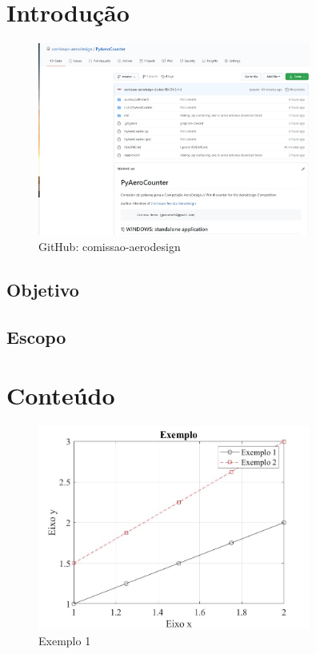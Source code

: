 \chapter{Introdução}
\label{cap:introducao}

\lipsum[1]

\begin{figure}[H]
    \centering
    \includegraphics[width=0.8\textwidth]{images/gitfig.jpg}
    \caption{GitHub: comissao-aerodesign}
    \label{fig:my_label}
\end{figure}

\lipsum[2-4]

\section{Objetivo}

\lipsum[5]

\section{Escopo}

\lipsum[6-7]

\chapter{Conteúdo}

\lipsum[5-6]

\begin{figure}[H]
    \centering
    \includegraphics[width=0.8\textwidth]{images/exemplo1.jpg}
    \caption{Exemplo 1 \cite{exemploref}}
    \label{fig:exemplo 1}
\end{figure}


